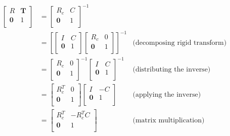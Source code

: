 \begin{align}
\left[
\begin{array}{c|c}
R & \boldsymbol{T} \\
\hline 
\boldsymbol{0} & 1 \\
\end{array}
\right]
  &= 
\left[
\begin{array}{c|c}
R_c & C \\
\hline
\boldsymbol{0} & 1 \\
\end{array}
\right]^{-1} \\
  &= 
\left[
\left[
\begin{array}{c|c}
I & C \\
\hline
\boldsymbol{0} & 1 \\
\end{array}
\right]
\left[
\begin{array}{c|c}
R_c & 0 \\
\hline
\boldsymbol{0} & 1 \\
\end{array}
\right]
\right]^{-1} & \text{(decomposing rigid transform)} \\
&= 
\left[
\begin{array}{c|c}
R_c & 0 \\
\hline
\boldsymbol{0} & 1 \\
\end{array}
\right]^{-1} 
\left[
\begin{array}{c|c}
I & C \\
\hline
\boldsymbol{0} & 1 \\
\end{array}
\right]^{-1} & \text{(distributing the inverse)}\\
&= 
\left[
\begin{array}{c|c}
R_c^T & 0 \\
\hline
\boldsymbol{0} & 1 \\
\end{array}
\right]
\left[
\begin{array}{c|c}
I & -C \\
\hline
\boldsymbol{0} & 1 \\
\end{array}
\right] & \text{(applying the inverse)}\\
&= 
\left[
\begin{array}{c|c}
R_c^T & -R_c^TC \\
\hline
\boldsymbol{0} & 1 \\
\end{array}
\right] & \text{(matrix multiplication)}
\end{align} 

